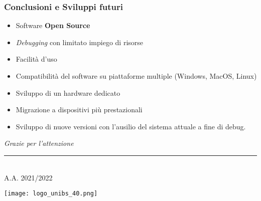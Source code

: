 \documentclass[aspectratio=169,
]{beamer}
\makeatletter
\newcommand{\insertrawshotauthor}{\beamer@shortauthor}
\makeatother
\begin{document}
    \begin{frame}
        \frametitle{Conclusioni e Sviluppi futuri}

        \begin{itemize}
            \item <1-> Software \textbf{Open Source}
            \item <1-> \textit{Debugging} con limitato impiego di risorse
            \item <1-> Facilità d'uso
            \item <1-> Compatibilità del software su piattaforme multiple (Windows, MacOS, Linux)
        \end{itemize}
    
        \begin{itemize}
            \item<2-> Sviluppo di un hardware dedicato
            \item<2-> Migrazione a dispositivi più prestazionali
            \item<2-> Sviluppo di nuove versioni con l'ausilio del sistema attuale a fine di debug.
        \end{itemize}
    
    \end{frame}

    \appendix
    \begin{frame}
        \vspace*{4cm}
        \begin{center}
            \textit{Grazie per l'attenzione}
        \end{center}
        \vspace*{2cm}
        \parbox{.85\linewidth}{
            \tiny
            \vspace*{10mm}
            {\color{unibsblue}\par\noindent\rule{\linewidth}{0.1pt}}\\
            \insertrawshotauthor\hfill
            A.A. 2021/2022\hfill
        }\hfill
        \parbox{.15\textwidth}{
            \vspace*{5mm}
            \hspace*{5mm}
            \texttt{[image: logo\_unibs\_40.png]}
        }
        
    \end{frame}
    
\end{document}
